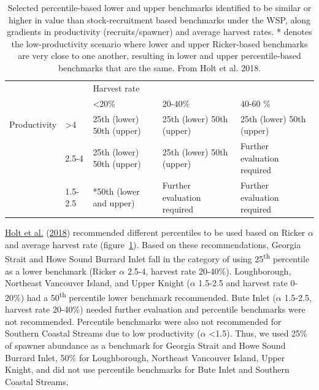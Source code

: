 \documentclass[11pt]{book}
\begin{document}
\renewcommand*{\arraystretch}{1.5}
\begin{table}[ht]
\centering
\caption{Selected percentile-based lower and upper benchmarks identified to be similar or higher in value than stock-recruitment based benchmarks under the WSP, along gradients in productivity (recruits/spawner) and average harvest rates. * denotes the low-productivity scenario where lower and upper Ricker-based benchmarks are very close to one another, resulting in lower and upper percentile-based benchmarks that are the same. From Holt et al. 2018.}
\begin{tabular}{l l p{2.5cm} p{2.5cm} p{2.5cm}}
\hline       &     & \multicolumn{3}{l}{Harvest rate}\\ 
& & <20\% & 20-40\% & 40-60 \% \\
\hline
Productivity& >4 & 25th (lower)  50th (upper) & 25th (lower) 50th (upper) & 25th (lower) 50th (upper) \\
& 2.5-4 & 25th (lower) 50th (upper) & 25th (lower) 50th (upper) & Further evaluation required \\
& 1.5-2.5 & *50th (lower and upper) & Further evaluation required & Further evaluation required \\               
\hline
\end{tabular}
\label{tab:holt-tab6}
\end{table}
\protect\hyperlink{ref-holtEvaluatingBenchmarksBiological2018}{Holt et al.} (\protect\hyperlink{ref-holtEvaluatingBenchmarksBiological2018}{2018}) recommended different percentiles to be used based on Ricker \(\alpha\) and average harvest rate (figure~\ref{tab:holt-tab6}). Based on these recommendations, Georgia Strait and Howe Sound Burrard Inlet fall in the category of using 25\textsuperscript{th} percentile as a lower benchmark (Ricker \(\alpha\) 2.5-4, harvest rate 20-40\%). Loughborough, Northeast Vancouver Island, and Upper Knight (\(\alpha\) 1.5-2.5 and harvest rate 0-20\%) had a 50\textsuperscript{th} percentile lower benchmark recommended. Bute Inlet (\(\alpha\) 1.5-2.5, harvest rate 20-40\%) needed further evaluation and percentile benchmarks were not recommended. Percentile benchmarks were also not recommended for Southern Coastal Streams due to low productivity (\(\alpha\) \textless1.5). Thus, we used 25\% of spawner abundance as a benchmark for Georgia Strait and Howe Sound Burrard Inlet, 50\% for Loughborough, Northeast Vancouver Island, Upper Knight, and did not use percentile benchmarks for Bute Inlet and Southern Coastal Streams.
\end{document}

